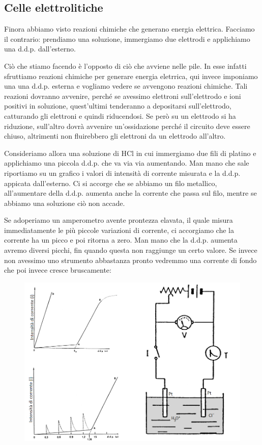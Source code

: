 \subsection{Celle elettrolitiche}
Finora abbiamo visto reazioni chimiche che generano energia elettrica. Facciamo il contrario: prendiamo una soluzione, immergiamo due elettrodi e applichiamo una d.d.p. dall'esterno.

Ciò che stiamo facendo è l'opposto di ciò che avviene nelle pile. In esse infatti sfruttiamo reazioni chimiche per generare energia eletrrica, qui invece imponiamo una una d.d.p. esterna e vogliamo vedere se avvengono reazioni chimiche. Tali reazioni dovranno avvenire, perché se avessimo elettroni sull'elettrodo e ioni positivi in soluzione, quest'ultimi tenderanno a depositarsi sull'elettrodo, catturando gli elettroni e quindi riducendosi. Se però su un elettrodo si ha riduzione, sull'altro dovrà avvenire un'ossidazione perché il circuito deve essere chiuso, altrimenti non fluirebbero gli elettroni da un elettrodo all'altro.

Consideriamo allora una soluzione di HCl in cui immergiamo due fili di platino e applichiamo una piccola d.d.p. che va via via aumentando. Man mano che sale riportiamo su un grafico i valori di intensità di corrente misurata e la d.d.p. appicata dall'esterno. Ci si accorge che se abbiamo un filo metallico, all'aumentare della d.d.p. aumenta anche la corrente che passa sul filo, mentre se abbiamo una soluzione ciò non accade.

Se adoperiamo un amperometro avente prontezza elavata, il quale misura immediatamente le più piccole variazioni di corrente, ci accorgiamo che la corrente ha un picco e poi ritorna a zero. Man mano che la d.d.p. aumenta avremo diversi picchi, fin quando questa non raggiunge un certo valore. Se invece non avessimo uno strumento abbastanza pronto vedremmo una corrente di fondo che poi invece cresce bruscamente:

\vspace{-0.5cm}\begin{figure}[H]
    \centering
    \includegraphics[width=14cm]{immagini/elettrolisi.png}
\end{figure}

